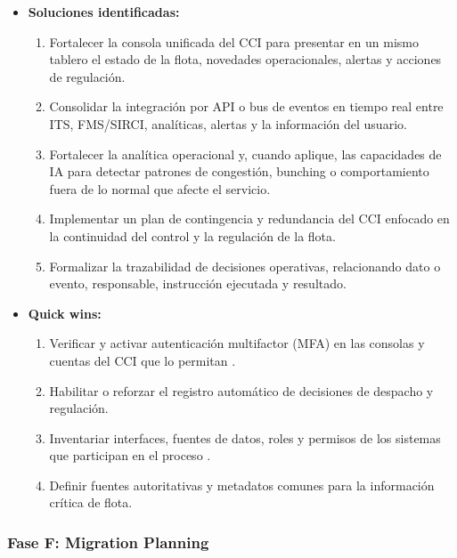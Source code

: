 \begin{singlespace}
\begin{itemize}
	\item \textbf{Soluciones identificadas:}
	\begin{enumerate}
		\item Fortalecer la consola unificada del CCI para presentar en un mismo tablero el estado de la flota, novedades operacionales, alertas y acciones de regulación.
		\item Consolidar la integración por API o bus de eventos en tiempo real entre ITS, FMS/SIRCI, analíticas, alertas y la información del usuario.
		\item Fortalecer la analítica operacional y, cuando aplique, las capacidades de IA para detectar patrones de congestión, bunching o comportamiento fuera de lo normal que afecte el servicio.
		\item Implementar un plan de contingencia y redundancia del CCI enfocado en la continuidad del control y la regulación de la flota.
		\item Formalizar la trazabilidad de decisiones operativas, relacionando dato o evento, responsable, instrucción ejecutada y resultado.
	\end{enumerate}
	\item \textbf{Quick wins:}
	\begin{enumerate}
		\item Verificar y activar autenticación multifactor (MFA) en las consolas y cuentas del CCI que lo permitan \parencite{mintic2021,transmilenio2025pesi}.
		\item Habilitar o reforzar el registro automático de decisiones de despacho y regulación.
		\item Inventariar interfaces, fuentes de datos, roles y permisos de los sistemas que participan en el proceso \parencite{mintic2021}.
		\item Definir fuentes autoritativas y metadatos comunes para la información crítica de flota.
	\end{enumerate}
\end{itemize}

\subsubsection*{Fase F: Migration Planning}


\end{singlespace}

